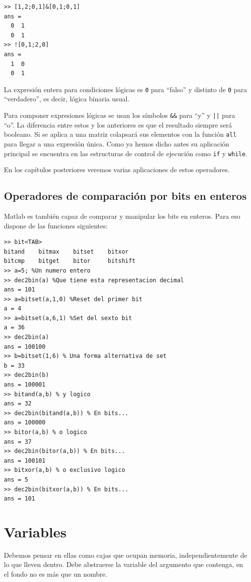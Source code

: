 \begin{lstlisting}
>> [1,2;0,1]&[0,1;0,1]
ans =
  0  1
  0  1
>> ![0,1;2,0]
ans =
  1  0
  0  1
\end{lstlisting}
La expresión entera para condiciones lógicas es \texttt{0} para
{}``falso'' y distinto de \texttt{0} para {}``verdadero'', es decir,
lógica binaria usual.

Para componer expresiones lógicas se usan los símbolos \texttt{\&\&}
para {}``y'' y \texttt{||} para {}``o''. La diferencia entre estos y
los anteriores es que el resultado siempre será booleano. Si se aplica
a una matriz colapsará sus elementos con la función \texttt{all} para
llegar a una expresión única. Como ya hemos dicho antes su aplicación
principal se encuentra en las estructuras de control de ejecución como
\texttt{if} y \texttt{while}.

En los capítulos posteriores veremos varias aplicaciones de estos
operadores.


\subsection{Operadores de comparación por bits en enteros}

Matlab es también capaz de comparar y manipular los bits en enteros.
Para eso dispone de las funciones siguientes:
\begin{lstlisting}
>> bit<TAB>
bitand    bitmax    bitset    bitxor
bitcmp    bitget    bitor     bitshift
>> a=5; %Un numero entero
>> dec2bin(a) %Que tiene esta representacion decimal
ans = 101
>> a=bitset(a,1,0) %Reset del primer bit
a = 4
>> a=bitset(a,6,1) %Set del sexto bit
a = 36
>> dec2bin(a)
ans = 100100
>> b=bitset(1,6) % Una forma alternativa de set
b = 33
>> dec2bin(b)
ans = 100001
>> bitand(a,b) % y logico
ans = 32
>> dec2bin(bitand(a,b)) % En bits...
ans = 100000
>> bitor(a,b) % o logico
ans = 37
>> dec2bin(bitor(a,b)) % En bits...
ans = 100101
>> bitxor(a,b) % o exclusivo logico
ans = 5
>> dec2bin(bitxor(a,b)) % En bits...
ans = 101
\end{lstlisting}

\section{Variables}

Debemos pensar en ellas como cajas que ocupan memoria,
independientemente de lo que lleven dentro. Debe abstraerse la
variable del argumento que contenga, en el fondo no es más que un
nombre.

